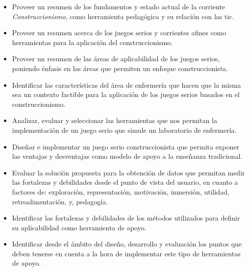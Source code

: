 \begin{itemize}
    \item Proveer un resumen de los fundamentos y estado actual de la corriente
        \emph{Construccionismo}, como herramienta pedagógica y su relación con
        las \Gls{tic}.

    \item Proveer un resumen acerca de los juegos serios y corrientes afines como
        herramientas para la aplicación del construccionismo.
    
    \item Proveer un resumen de las áreas de aplicabilidad de los juegos serios, poniendo
        énfasis en las áreas que permiten un enfoque construccionista.
        
    \item Identificar las características del área de enfermería que hacen que
        la misma sea un contexto factible para la aplicación de los juegos
        serios basados en el construccionismo.
    
    \item Analizar, evaluar y seleccionar las herramientas que nos permitan la
        implementación de un juego serio que simule un laboratorio de
        enfermería.
        
    \item Diseñar e implementar un juego serio construccionista que permita
        exponer las ventajas y desventajas como modelo de apoyo a la enseñanza
        tradicional. 
        
    \item Evaluar la solución propuesta para la obtención de datos que permitan
        medir las fortalezas y debilidades desde el punto de vista del usuario,
        en cuanto a factores de: exploración, representación, motivación, inmersión,
        utilidad, retroalimentación, y, pedagogía.

    \item Identificar las fortalezas y debilidades de los métodos utilizados
        para definir su aplicabilidad como herramienta de apoyo. 

     \item Identificar desde el ámbito del diseño, desarrollo y evaluación los 
        puntos que deben tenerse en cuenta a la hora de implementar este tipo de 
        herramientas de apoyo.
\end{itemize}
